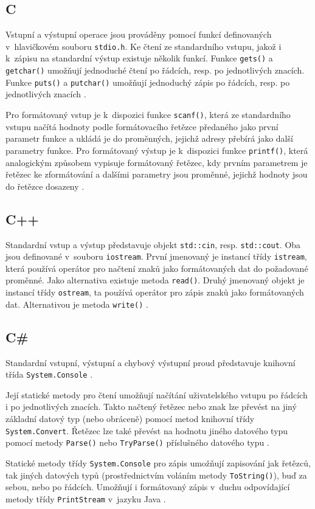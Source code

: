 \documentclass[czech,BP]{thesiskiv}
\begin{document}
\subsection{C}
Vstupní a výstupní operace jsou prováděny pomocí funkcí definovaných v~hlavičkovém souboru \texttt{stdio.h}. Ke čtení ze standardního vstupu, jakož i k~zápisu na standardní výstup existuje několik funkcí. Funkce \texttt{gets()} a \texttt{getchar()} umožňují jednoduché čtení po řádcích, resp. po jednotlivých znacích. Funkce \texttt{puts()} a \texttt{putchar()} umožňují jednoduchý zápis po řádcích, resp. po jednotlivých znacích \cite{cpp-guide-cstdio}.\par
Pro formátovaný vstup je k~dispozici funkce \texttt{scanf()}, která ze standardního vstupu načítá hodnoty podle formátovacího řetězce předaného jako první parametr funkce a ukládá je do proměnných, jejichž adresy přebírá jako další parametry funkce. Pro formátovaný výstup je k~dispozici funkce \texttt{printf()}, která analogickým způsobem vypisuje formátovaný řetězec, kdy prvním parametrem je řetězec ke zformátování a dalšími parametry jsou proměnné, jejichž hodnoty jsou do řetězce dosazeny \cite{cpp-guide-scanf, cpp-guide-printf}.

\subsection{C++}
Standardní vstup a výstup představuje objekt \texttt{std::cin}, resp. \texttt{std::cout}. Oba jsou definované v~souboru \texttt{iostream}. První jmenovaný je instancí třídy \texttt{istream}, která používá operátor \uv{$>>$} pro načtení znaků jako formátovaných dat do požadované proměnné. Jako alternativa existuje metoda \texttt{read()}. Druhý jmenovaný objekt je instancí třídy \texttt{ostream}, ta používá operátor \uv{$<<$} pro zápis znaků jako formátovaných dat. Alternativou je metoda \texttt{write()} \cite{cpp-guide-iostream, cpp-guide-stdcin, cpp-guide-stdcout}.

\subsection{C\#}
Standardní vstupní, výstupní a chybový výstupní proud představuje knihovní třída \texttt{System.Console} \cite{cs-guide-console}.\par 
Její statické metody pro čtení umožňují načítání uživatelského vstupu po řádcích i po jednotlivých znacích. Takto načtený řetězec nebo znak lze převést na jiný základní datový typ (nebo obráceně) pomocí metod knihovní třídy \texttt{System.Convert}. Řetězec lze také převést na hodnotu jiného datového typu pomocí metody \texttt{Parse()} nebo \texttt{TryParse()} příslušného datového typu \cite{cs-guide-convert, cs-guide-sbyte, cs-guide-short, cs-guide-int, cs-guide-long, cs-guide-float, cs-guide-double, cs-guide-bool, cs-guide-char}.\par
Statické metody třídy \texttt{System.Console} pro zápis umožňují zapisování jak řetězců, tak jiných datových typů (prostřednictvím voláním metody \newline\texttt{ToString()}), buď za sebou, nebo po řádcích. Umožňují i formátovaný zápis v~duchu odpovídající metody třídy \texttt{PrintStream} v~jazyku Java \cite{cs-guide-console}.
\end{document}
